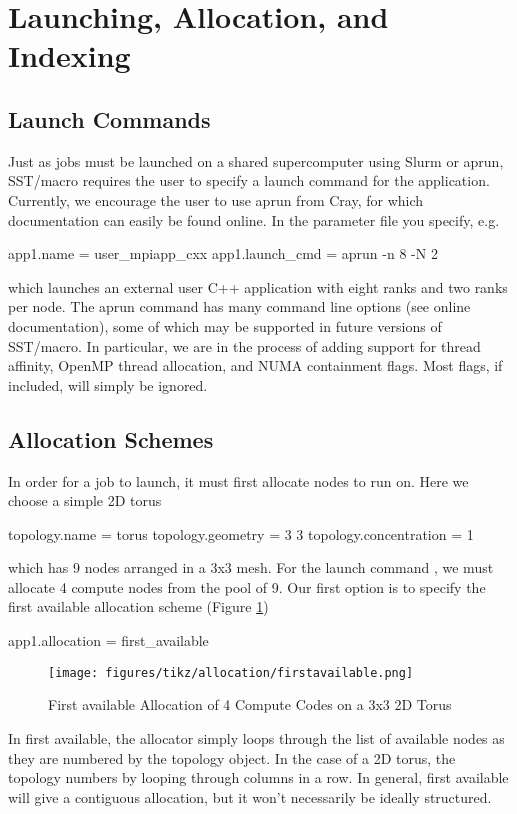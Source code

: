 
\section{Launching, Allocation, and Indexing}
\label{sec:tutorial:launchetc}

\subsection{Launch Commands}
\label{subsec:tutorial:launch}
Just as jobs must be launched on a shared supercomputer using Slurm or aprun, 
SST/macro requires the user to specify a launch command for the application.
Currently, we encourage the user to use aprun from Cray, for which documentation can easily be found online.
In the parameter file you specify, e.g.

\begin{ViFile}
app1.name = user_mpiapp_cxx
app1.launch_cmd = aprun -n 8 -N 2
\end{ViFile}
which launches an external user C++ application with eight ranks and two ranks per node.
The aprun command has many command line options (see online documentation), some of which may be supported in future versions of SST/macro.  In particular, we are in the process of adding support for thread affinity, OpenMP thread allocation, and NUMA containment flags.  Most flags, if included, will simply be ignored.

\subsection{Allocation Schemes}
\label{subsec:tutorial:allocation}
In order for a job to launch, it must first allocate nodes to run on. Here we choose a simple 2D torus

\begin{ViFile}
topology.name = torus
topology.geometry = 3 3
topology.concentration = 1
\end{ViFile}
which has 9 nodes arranged in a 3x3 mesh.  
For the launch command , we must allocate 4 compute nodes from the pool of 9.
Our first option is to specify the first available allocation scheme (Figure \ref{fig:allocation:first_available})

\begin{ViFile}
app1.allocation = first_available
\end{ViFile}
\begin{figure}[h]
\centering
\texttt{[image: figures/tikz/allocation/firstavailable.png]}
\caption{First available Allocation of 4 Compute Codes on a 3x3 2D Torus}
\label{fig:allocation:first_available}
\end{figure}
In first available, the allocator simply loops through the list of available nodes as they are numbered by the topology object.
In the case of a 2D torus, the topology numbers by looping through columns in a row.
In general, first available will give a contiguous allocation, but it won't necessarily be ideally structured.

